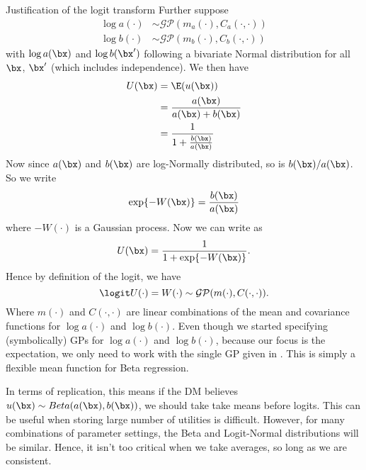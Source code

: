 \begin{chapter}{Justification of the logit transform}
Further suppose
\begin{align}
  \log a(\cdot) &\sim \mathcal{GP}(m_a(\cdot), C_a(\cdot, \cdot))\\
  \log b(\cdot) &\sim \mathcal{GP}(m_b(\cdot), C_b(\cdot, \cdot))
\end{align}
with  $\log a(\bx) $ and $\log b(\bx') $ following a bivariate Normal distribution for all $\bx$, $\bx'$ (which includes independence). We then have
\begin{align}
  U(\bx) &= \E(u(\bx))\\
         &= \frac{a(\bx)}{a(\bx)+b(\bx)}\\
         &= \frac{1}{1 + \frac{b(\bx)}{a(\bx)}} \label{Eq:fraction}
\end{align}
Now since $a(\bx)$ and $b(\bx)$ are log-Normally distributed, so is $b(\bx)/a(\bx)$. So we write
\begin{equation}
  \exp\{-W(\bx)\} = \frac{b(\bx)}{a(\bx)}
\end{equation}
where $-W(\cdot)$ is a Gaussian process. Now we can write  as
\begin{equation}
  U(\bx) =  \frac{1}{1 + \exp\{-W(\bx)\}}.
\end{equation}
Hence by definition of the logit, we have
\begin{equation}
  \logit U(\cdot) = W(\cdot) \sim \mathcal{GP}(m(\cdot), C(\cdot, \cdot)). \label{Eq:logit-gp}
\end{equation}
Where $m(\cdot)$ and $C(\cdot,\cdot)$ are linear combinations of the mean and covariance functions for $\log a(\cdot)$ and $\log b(\cdot)$. Even though we started specifying (symbolically) GPs for $\log a(\cdot)$ and $\log b(\cdot)$, because our focus is the expectation, we only need to work with the single GP given in . This is simply a flexible mean function for Beta regression.

In terms of replication, this means if the DM believes $u(\bx) \sim Beta(a(\bx), b(\bx))$, we should take take means before logits. This can be useful when storing large number of utilities is difficult. However, for many combinations of parameter settings, the Beta and Logit-Normal distributions will be similar. Hence, it isn't too critical when we take averages, so long as we are consistent.
\end{chapter}

